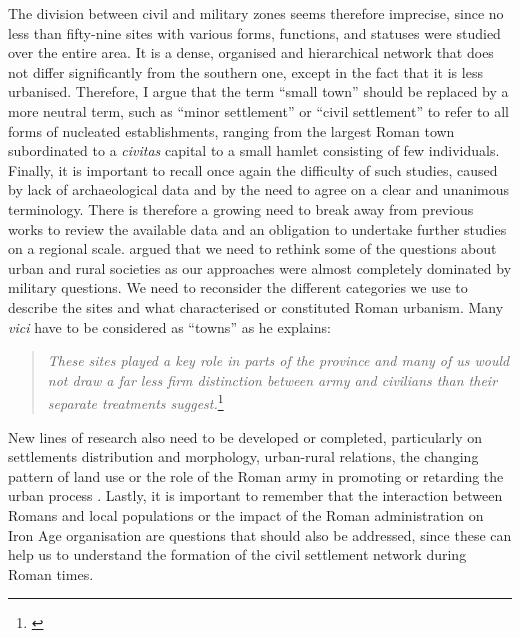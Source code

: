 The division between civil and military zones seems therefore imprecise, since no less than fifty-nine sites with various forms, functions, and statuses were studied over the entire area. It is a dense, organised and hierarchical network that does not differ significantly from the southern one, except in the fact that it is less urbanised. Therefore, I argue that the term “small town” should be replaced by a more neutral term, such as “minor settlement” or “civil settlement” to refer to all forms of nucleated establishments, ranging from the largest Roman town subordinated to a \textit{civitas} capital to a small hamlet consisting of few individuals. Finally, it is important to recall once again the difficulty of such studies, caused by lack of archaeological data and by the need to agree on a clear and unanimous terminology. There is therefore a growing need to break away from previous works to review the available data and an obligation to undertake further studies on a regional scale. \textcite[66]{Millett_2001} argued that we need to rethink some of the questions about urban and rural societies as our approaches were almost completely dominated by military questions. We need to reconsider the different categories we use to describe the sites and what characterised or constituted Roman urbanism. Many \textit{vici} have to be considered as “towns” as he explains: 

\blockquote{\textit{These sites played a key role in parts of the province and many of us would not draw a far less firm distinction between army and civilians than their separate treatments suggest.}\footnote{\textcite[64]{Millett_2001}}}

New lines of research also need to be developed or completed, particularly on settlements distribution and morphology, urban-rural relations, the changing pattern of land use or the role of the Roman army in promoting or retarding the urban process \parencite[74--75]{Burnham_2001}. 
Lastly, it is important to remember that the interaction between Romans and local populations or the impact of the Roman administration on Iron Age organisation are questions that should also be addressed, since these can help us to understand the formation of the civil settlement network during Roman times.


